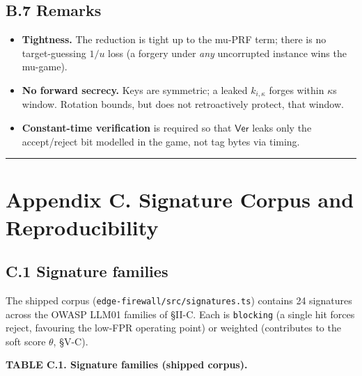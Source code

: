 \subsection{B.7 Remarks}\label{b7-remarks}

\begin{itemize}
\tightlist
\item
  \textbf{Tightness.} The reduction is tight up to the mu-PRF term;
  there is no target-guessing \(1/u\) loss (a forgery under \emph{any}
  uncorrupted instance wins the mu-game).
\item
  \textbf{No forward secrecy.} Keys are symmetric; a leaked
  \(k_{i,\kappa}\) forges within \(\kappa\)\textquotesingle s window.
  Rotation bounds, but does not retroactively protect, that window.
\item
  \textbf{Constant-time verification} is required so that
  \(\mathsf{Ver}\) leaks only the accept/reject bit modelled in the
  game, not tag bytes via timing.
\end{itemize}

\begin{center}\rule{0.5\linewidth}{0.5pt}\end{center}

\section{Appendix C. Signature Corpus and
Reproducibility}\label{appendix-c-signature-corpus-and-reproducibility}

\subsection{C.1 Signature families}\label{c1-signature-families}

The shipped corpus
(\passthrough{\lstinline!edge-firewall/src/signatures.ts!}) contains 24
signatures across the OWASP LLM01 families of §II-C. Each is
\passthrough{\lstinline!blocking!} (a single hit forces reject,
favouring the low-FPR operating point) or weighted (contributes to the
soft score \(\theta\), §V-C).

\textbf{TABLE C.1. Signature families (shipped corpus).}

